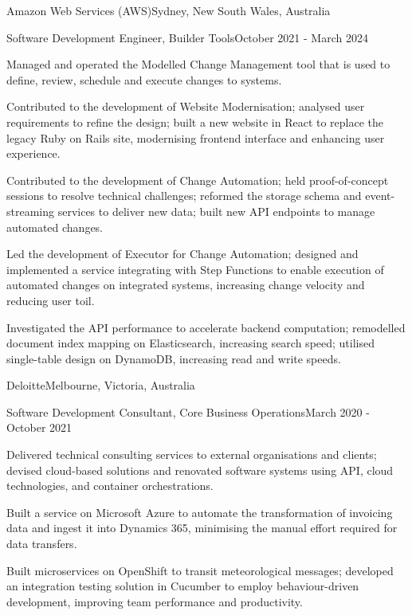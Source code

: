 \documentclass{cv}
\begin{document}
\begin{cvlist}
\begin{cvheading}{Amazon Web Services (AWS)}{Sydney, New South Wales, Australia}
\begin{cvsubheading}{Software Development Engineer, Builder Tools}{October 2021 - March 2024}
    \item Managed and operated the Modelled Change Management tool that is used to define, review, schedule and execute changes to systems.
    \item Contributed to the development of Website Modernisation; analysed user requirements to refine the design; built a new website in React to replace the legacy Ruby on Rails site, modernising frontend interface and enhancing user experience.
    \item Contributed to the development of Change Automation; held proof-of-concept sessions to resolve technical challenges; reformed the storage schema and event-streaming services to deliver new data; built new API endpoints to manage automated changes.
    \item Led the development of Executor for Change Automation; designed and implemented a service integrating with Step Functions to enable execution of automated changes on integrated systems, increasing change velocity and reducing user toil.
    \item Investigated the API performance to accelerate backend computation; remodelled document index mapping on Elasticsearch, increasing search speed; utilised single-table design on DynamoDB, increasing read and write speeds.
\end{cvsubheading}
\end{cvheading}

\begin{cvheading}{Deloitte}{Melbourne, Victoria, Australia}
\begin{cvsubheading}{Software Development Consultant, Core Business Operations}{March 2020 - October 2021}
    \item Delivered technical consulting services to external organisations and clients; devised cloud-based solutions and renovated software systems using API, cloud technologies, and container orchestrations.
    \item Built a service on Microsoft Azure to automate the transformation of invoicing data and ingest it into Dynamics 365, minimising the manual effort required for data transfers.
    \item Built microservices on OpenShift to transit meteorological messages; developed an integration testing solution in Cucumber to employ behaviour-driven development, improving team performance and productivity.
\end{cvsubheading}
\end{cvheading}


\end{cvlist}
\end{document}
